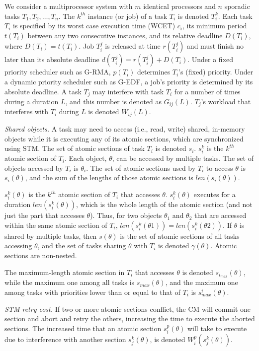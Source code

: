 \documentclass{sig-alternate}
\begin{document}
We consider a multiprocessor system with $m$ identical processors and $n$ sporadic tasks $T_1, T_2,\ldots, T_n$. The $k^{th}$ instance (or job) of a task $T_i$ is denoted $T_i^k$. Each task $T_i$ is specified by its worst case execution time (WCET) $c_i$, its minimum period $t(T_i)$ between any two consecutive instances, and its relative deadline $D(T_i)$, where $D(T_i)=t(T_i)$. Job $T_i^j$ is released at time $r(T_i^j)$ and must finish no later than its absolute deadline $d(T_i^j)=r(T_i^j)+D(T_i)$. Under a fixed priority scheduler such as G-RMA, $p(T_i)$ determines $T_i$'s (fixed) priority. Under a dynamic priority scheduler such as G-EDF, a job's priority is determined by its absolute deadline. 
A task $T_j$ may interfere with task $T_i$ for a number of times during a duration $L$, and this number is denoted as $G_{ij}(L)$. 
$T_j$'s workload that interferes with $T_i$ during $L$ is denoted $W_{ij}(L)$.


\textit{Shared objects.} A task may need to access (i.e., read, write) shared, in-memory objects while it is executing any of its atomic sections, which are synchronized using STM. 
The set of atomic sections of task $T_i$ is denoted $s_i$. $s_i^k$ is the $k^{th}$ atomic section of $T_i$. 
Each object, $\theta$, can be accessed by multiple tasks. The set of objects accessed by $T_i$ is $\theta_i$.
The set of atomic sections used by $T_i$ to access $\theta$ is $s_i(\theta)$, and the sum of the lengths of those atomic sections is $len(s_i(\theta))$. 

$s_i^k(\theta)$ is the $k^{th}$ atomic section of $T_i$ that accesses $\theta$. $s_i^k(\theta)$  executes for a duration $len(s_i^k(\theta))$, which is the whole length of the atomic section (and not just the part that accesses $\theta$). 
Thus, for two objects $\theta_1$ and $\theta_2$ that are accessed within the same atomic section of $T_i$, $len(s_i^k(\theta1))=len(s_i^k(\theta2))$. 
If $\theta$ is shared by multiple tasks, then $s(\theta)$ is the set of atomic sections of all tasks accessing $\theta$, and the set of tasks sharing $\theta$ with $T_i$ is denoted $\gamma (\theta)$. Atomic sections are non-nested.

The maximum-length atomic section in $T_i$ that accesses $\theta$ is denoted $s_{i_{max}} (\theta)$, while the maximum one among all tasks is $s_{max} (\theta)$, and the maximum one among tasks with priorities lower than or equal to that of $T_i$ is $s_{max}^i (\theta)$.

\textit{STM retry cost.} If two or more atomic sections conflict, the CM will commit one section and abort and retry the others, increasing the time to execute the aborted sections. The increased time that an atomic section $s_i^p (\theta)$ will take to execute due to interference with another section $s_j^k (\theta)$, is denoted $W_{i}^{p}(s_{j}^{k}(\theta))$. 
\end{document}

